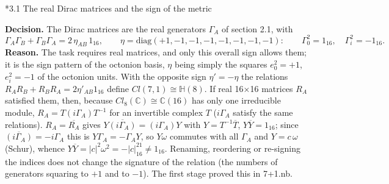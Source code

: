 \documentclass[10pt,a4paper]{article}
\makeatletter
\renewcommand\subsection{\@startsection{subsection}{2}{\z@}{-3.25ex\@plus -1ex \@minus -.2ex}{1.5ex \@plus .2ex}{\normalfont\large\bfseries\raggedright}}
\makeatother
\begin{document}
\subsection*{3.1 The real Dirac matrices and the sign of the metric}
\textbf{Decision.} The Dirac matrices are the real generators $\Gamma_A$ of section 2.1, with
\begin{equation*}
\Gamma_A\Gamma_B+\Gamma_B\Gamma_A=2\,\eta_{AB}\,1_{16},\qquad \eta=\mathrm{diag}(+1,-1,-1,-1,-1,-1,-1,-1):\qquad \Gamma_0^2=1_{16},\quad \Gamma_i^2=-1_{16}.
\end{equation*}
\textbf{Reason.} The task requires real matrices, and only this overall sign allows them; it is the sign pattern of the octonion basis, $\eta$ being simply the squares $e_0^2=+1$, $e_i^2=-1$ of the octonion units. With the opposite sign $\eta'=-\eta$ the relations $R_AR_B+R_BR_A=2\eta'_{AB}1_{16}$ define $Cl(7,1)\cong\mathbb H(8)$. If real 16×16 matrices $R_A$ satisfied them, then, because $Cl_8(\mathbb C)\cong\mathbb C(16)$ has only one irreducible module, $R_A=T(i\Gamma_A)T^{-1}$ for an invertible complex $T$ ($i\Gamma_A$ satisfy the same relations). $R_A=\overline{R_A}$ gives $Y\overline{(i\Gamma_A)}=(i\Gamma_A)Y$ with $Y=T^{-1}\overline T$, $Y\overline Y=1_{16}$; since $\overline{(i\Gamma_A)}=-i\Gamma_A$ this is $Y\Gamma_A=-\Gamma_AY$, so $Y\omega$ commutes with all $\Gamma_A$ and $Y=c\,\omega$ (Schur), whence $Y\overline Y=|c|^2\omega^2=-|c|^21_{16}\neq1_{16}$. Renaming, reordering or re-signing the indices does not change the signature of the relation (the numbers of generators squaring to $+1$ and to $-1$). The first stage proved this in 7+1.nb.
\end{document}
